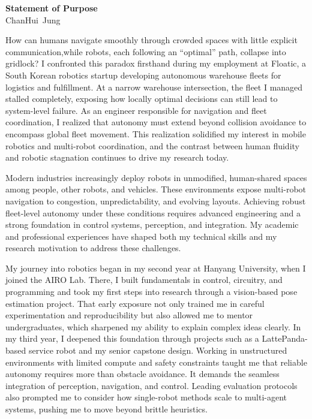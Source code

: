 \documentclass[12pt]{article}
\newcommand\firstName{ChanHui}
\newcommand\lastName{Jung}
\newcommand\fullName{\firstName~\lastName}
\begin{document}
\begin{center}
  {\large\bfseries Statement of Purpose}\\[-0.2em]
  {\normalsize \textcolor{sectiongray}{\fullName}}
\end{center}

How can humans navigate smoothly through crowded spaces with little explicit communication,while robots, each following an “optimal” path, collapse into gridlock? I confronted this paradox firsthand during my employment at Floatic, a South Korean robotics startup developing autonomous warehouse fleets for logistics and fulfillment. At a narrow warehouse intersection, the fleet I managed stalled completely, exposing how locally optimal decisions can still lead to system-level failure. As an engineer responsible for navigation and fleet coordination, I realized that autonomy must extend beyond collision avoidance to encompass global fleet movement. This realization solidified my interest in mobile robotics and multi-robot coordination, and the contrast between human fluidity and robotic stagnation continues to drive my research today.

\vspace{0.5em}
Modern industries increasingly deploy robots in unmodified, human-shared spaces among people, other robots, and vehicles. These environments expose multi-robot navigation to congestion, unpredictability, and evolving layouts. Achieving robust fleet-level autonomy under these conditions requires advanced engineering and a strong foundation in control systems, perception, and integration. My academic and professional experiences have shaped both my technical skills and my research motivation to address these challenges.

\vspace{0.5em}
My journey into robotics began in my second year at Hanyang University, when I joined the AIRO Lab. There, I built fundamentals in control, circuitry, and programming and took my first steps into research through a vision-based pose estimation project. That early exposure not only trained me in careful experimentation and reproducibility but also allowed me to mentor undergraduates, which sharpened my ability to explain complex ideas clearly. In my third year, I deepened this foundation through projects such as a LattePanda-based service robot and my senior capstone design. Working in unstructured environments with limited compute and safety constraints taught me that reliable autonomy requires more than obstacle avoidance. It demands the seamless integration of perception, navigation, and control. Leading evaluation protocols also prompted me to consider how single-robot methods scale to multi-agent systems, pushing me to move beyond brittle heuristics.
\end{document}
